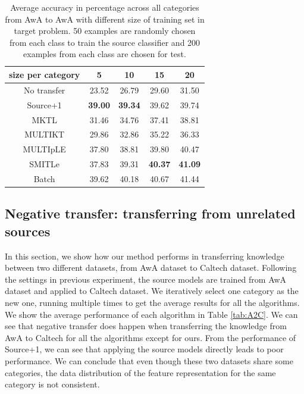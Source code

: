 \begin{table}[htbp]
  \centering
  \caption{Average accuracy in percentage across all categories from AwA to AwA with different size of training set in target problem. 50 examples are randomly chosen from each class to train the source classifier and 200 examples from each class are chosen for test.}
    \begin{tabular}{ccccc}
    \toprule
     size per category    & 5     & 10    & 15    & 20 \\
    \midrule
    No transfer &         23.52  &         26.79  &         29.60  &         31.50  \\
    Source+1    &         \textbf{39.00 } &         \textbf{39.34 } &         39.62 &         39.74  \\
    MKTL        &         31.46  &         34.76  &         37.41  &         38.81  \\
    MULTIKT     &         29.86  &         32.86  &         35.22  &         36.33  \\
    MULTIpLE    &         37.80  &         38.81  &         39.80  &         40.47  \\
    SMITLe        &        {37.83 } &         {39.31 } &         \textbf{40.37 } &         \textbf{41.09} \\
        \midrule
    Batch       &         39.62  &         40.18  &         40.67  &         41.44  \\
    \bottomrule
    \end{tabular}%
  \label{tab:A2A}%
\end{table}%



\subsection{Negative transfer: transferring from unrelated sources}
In this section, we show how our method performs in transferring knowledge between two different datasets, from AwA dataset to Caltech dataset. Following the settings in previous experiment, the source models are trained from AwA dataset and applied to Caltech dataset. We iteratively select one category as the new one, running multiple times to get the average results for all the algorithms. We show the average performance of each algorithm in Table \ref{tab:A2C}. We can see that negative transfer does happen when transferring the knowledge from AwA to Caltech for all the algorithms except for ours. From the performance of Source+1, we can see that applying the source models directly leads to poor performance. We can conclude that even though these two datasets share some categories, the data distribution of the feature representation for the same category is not consistent. 

